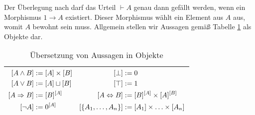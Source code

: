 Der Überlegung nach darf das Urteil $\vdash A$ genau dann gefällt
werden, wenn ein Morphismus $1\to A$ existiert. Dieser Morphismus
wählt ein Element aus $A$ aus, womit $A$ bewohnt sein muss.
Allgemein stellen wir Aussagen gemäß Tabelle \ref{tab:Aussagen-zu-Objekten}
als Objekte dar.

\begin{table}
\begin{center}
\caption{Übersetzung von Aussagen in Objekte}%
\label{tab:Aussagen-zu-Objekten}
\begin{tabular}{l}
\toprule
$\begin{aligned}
{}[A\land B] &:= [A]\times [B] & [\bot] &:= 0\\
[A\lor B] &:= [A]\sqcup [B] &  [\top] &:= 1\\
[A\cond B] &:= [B]^{[A]} & [A\bicond B] &:= [B]^{[A]}\times [A]^{[B]}\\
[\lnot A] &:= 0^{[A]} & [\{A_1,\ldots,A_n\}] &:= [A_1]\times\ldots\times [A_n]
\end{aligned}$\\
\bottomrule
\end{tabular}
\end{center}
\end{table}


